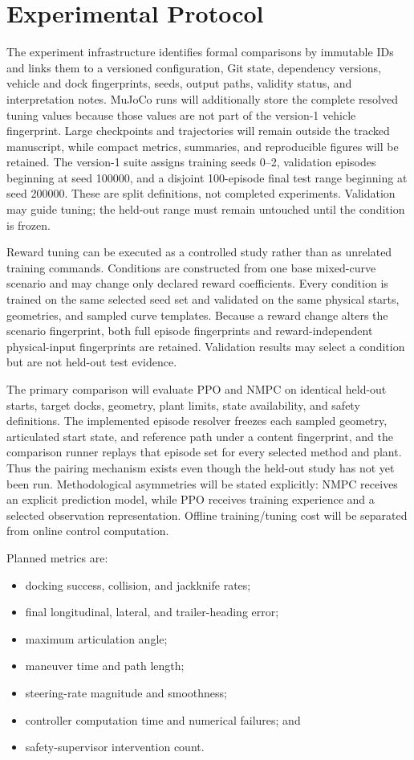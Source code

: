 \section{Experimental Protocol}

\implemented{} The experiment infrastructure identifies formal comparisons by
immutable IDs and links them to a
versioned configuration, Git state, dependency versions, vehicle and dock
fingerprints, seeds, output paths, validity status, and interpretation notes.
MuJoCo runs will additionally store the complete resolved tuning values because
those values are not part of the version-1 vehicle fingerprint.
Large checkpoints and trajectories will remain outside the tracked manuscript,
while compact metrics, summaries, and reproducible figures will be retained.
The version-1 suite assigns training seeds 0--2, validation episodes beginning
at seed 100000, and a disjoint 100-episode final test range beginning at seed
200000. These are split definitions, not completed experiments. Validation may
guide tuning; the held-out range must remain untouched until the condition is
frozen.

\implemented{} Reward tuning can be executed as a controlled study rather than
as unrelated training commands. Conditions are constructed from one base
mixed-curve scenario and may change only declared reward coefficients. Every
condition is trained on the same selected seed set and validated on the same
physical starts, geometries, and sampled curve templates. Because a reward
change alters the scenario fingerprint, both full episode fingerprints and
reward-independent physical-input fingerprints are retained. Validation
results may select a condition but are not held-out test evidence.

The primary comparison will evaluate PPO and NMPC on identical held-out starts,
target docks, geometry, plant limits, state availability, and safety definitions.
The implemented episode resolver freezes each sampled geometry, articulated
start state, and reference path under a content fingerprint, and the comparison
runner replays that episode set for every selected method and plant. Thus the
pairing mechanism exists even though the held-out study has not yet been run.
Methodological asymmetries will be stated explicitly: NMPC receives an explicit
prediction model, while PPO receives training experience and a selected
observation representation. Offline training/tuning cost will be separated
from online control computation.

Planned metrics are:
\begin{itemize}
  \item docking success, collision, and jackknife rates;
  \item final longitudinal, lateral, and trailer-heading error;
  \item maximum articulation angle;
  \item maneuver time and path length;
  \item steering-rate magnitude and smoothness;
  \item controller computation time and numerical failures; and
  \item safety-supervisor intervention count.
\end{itemize}

